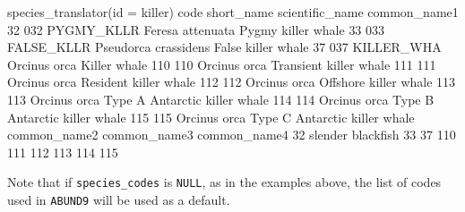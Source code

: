 \documentclass[
]{book}
\newenvironment{Shaded}{\begin{snugshade}}{\end{snugshade}}
\newcommand{\AttributeTok}[1]{\textcolor[rgb]{0.77,0.63,0.00}{#1}}
\newcommand{\DecValTok}[1]{\textcolor[rgb]{0.00,0.00,0.81}{#1}}
\newcommand{\FunctionTok}[1]{\textcolor[rgb]{0.00,0.00,0.00}{#1}}
\newcommand{\NormalTok}[1]{#1}
\newcommand{\StringTok}[1]{\textcolor[rgb]{0.31,0.60,0.02}{#1}}
\begin{document}
\begin{Shaded}
\begin{Highlighting}[]
\FunctionTok{species\_translator}\NormalTok{(}\AttributeTok{id =} \StringTok{\textquotesingle{}killer\textquotesingle{}}\NormalTok{)}
\NormalTok{    code short\_name      scientific\_name                  common\_name1}
\DecValTok{32}   \DecValTok{032}\NormalTok{ PYGMY\_KLLR     Feresa attenuata            Pygmy killer whale}
\DecValTok{33}   \DecValTok{033}\NormalTok{ FALSE\_KLLR Pseudorca crassidens            False killer whale}
\DecValTok{37}   \DecValTok{037}\NormalTok{ KILLER\_WHA         Orcinus orca                  Killer whale}
\DecValTok{110}  \DecValTok{110}\NormalTok{                    Orcinus orca        Transient killer whale}
\DecValTok{111}  \DecValTok{111}\NormalTok{                    Orcinus orca         Resident killer whale}
\DecValTok{112}  \DecValTok{112}\NormalTok{                    Orcinus orca         Offshore killer whale}
\DecValTok{113}  \DecValTok{113}\NormalTok{                    Orcinus orca Type A Antarctic killer whale}
\DecValTok{114}  \DecValTok{114}\NormalTok{                    Orcinus orca Type B Antarctic killer whale}
\DecValTok{115}  \DecValTok{115}\NormalTok{                    Orcinus orca Type C Antarctic killer whale}
\NormalTok{         common\_name2 common\_name3 common\_name4}
\DecValTok{32}\NormalTok{  slender blackfish                          }
\DecValTok{33}                                             
\DecValTok{37}                                             
\DecValTok{110}                                            
\DecValTok{111}                                            
\DecValTok{112}                                            
\DecValTok{113}                                            
\DecValTok{114}                                            
\DecValTok{115}                                            
\end{Highlighting}
\end{Shaded}

Note that if \texttt{species\_codes} is \texttt{NULL}, as in the examples above, the list of codes used in \texttt{ABUND9} will be used as a default.

  
\end{document}
